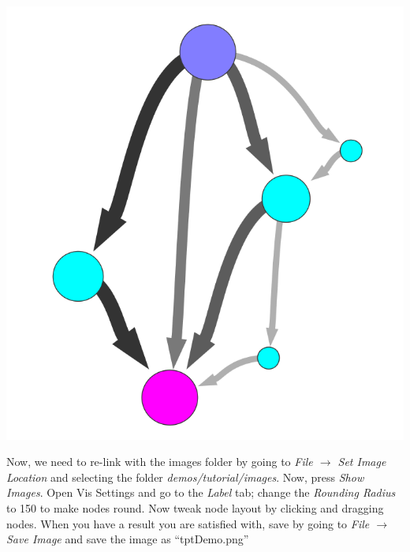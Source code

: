 \documentclass[10pt,a4paper]{report}
\begin{document}
\begin{center}
\includegraphics[scale=.3]{basicTPT.png}
\end{center}

Now, we need to re-link with the images folder by going to \emph{File $\rightarrow$ Set Image Location} and selecting the folder \emph{demos/tutorial/images}. Now, press \emph{Show Images}. Open Vis Settings and go to the \emph{Label} tab; change the \emph{Rounding Radius} to 150 to make nodes round. Now tweak node layout by clicking and dragging nodes. When you have a result you are satisfied with, save by going to \emph{File $\rightarrow$ Save Image} and save the image as ``tptDemo.png''
\end{document}

